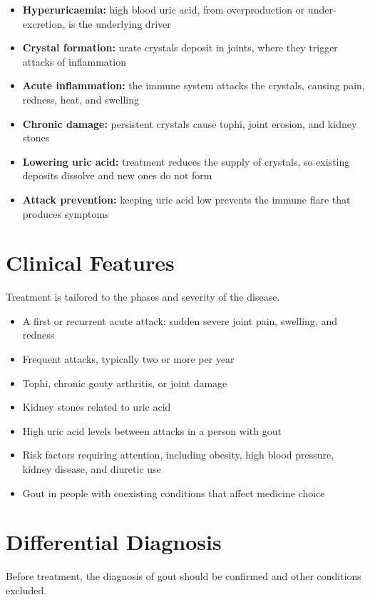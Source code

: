 \begin{itemize}
    \item \textbf{Hyperuricaemia:} high blood uric acid, from overproduction or under-excretion, is the underlying driver
    \item \textbf{Crystal formation:} urate crystals deposit in joints, where they trigger attacks of inflammation
    \item \textbf{Acute inflammation:} the immune system attacks the crystals, causing pain, redness, heat, and swelling
    \item \textbf{Chronic damage:} persistent crystals cause tophi, joint erosion, and kidney stones
    \item \textbf{Lowering uric acid:} treatment reduces the supply of crystals, so existing deposits dissolve and new ones do not form
    \item \textbf{Attack prevention:} keeping uric acid low prevents the immune flare that produces symptoms
\end{itemize}

\section*{Clinical Features}
Treatment is tailored to the phases and severity of the disease.

\begin{itemize}
    \item A first or recurrent acute attack: sudden severe joint pain, swelling, and redness
    \item Frequent attacks, typically two or more per year
    \item Tophi, chronic gouty arthritis, or joint damage
    \item Kidney stones related to uric acid
    \item High uric acid levels between attacks in a person with gout
    \item Risk factors requiring attention, including obesity, high blood pressure, kidney disease, and diuretic use
    \item Gout in people with coexisting conditions that affect medicine choice
\end{itemize}

\section*{Differential Diagnosis}
Before treatment, the diagnosis of gout should be confirmed and other conditions excluded.

